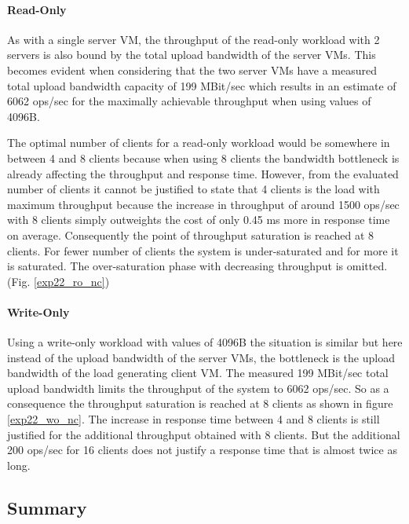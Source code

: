 \documentclass[report.tex]{subfiles}
\begin{document}
\paragraph{Read-Only}
As with a single server VM, the throughput of the read-only workload with 2 servers is also bound by the total upload bandwidth of the server VMs. This becomes evident when considering that the two server VMs have a measured total upload bandwidth capacity of 199 MBit/sec which results in an estimate of 6062 ops/sec for the maximally achievable throughput when using values of 4096B.

The optimal number of clients for a read-only workload would be somewhere in between 4 and 8 clients because when using 8 clients the bandwidth bottleneck is already affecting the throughput and response time. However, from the evaluated number of clients it cannot be justified to state that 4 clients is the load with maximum throughput because the increase in throughput of around 1500 ops/sec with 8 clients simply outweights the cost of only 0.45 ms more in response time on average. Consequently the point of throughput saturation is reached at 8 clients. For fewer number of clients the system is under-saturated and for more it is saturated. The over-saturation phase with decreasing throughput is omitted. (Fig. \ref{exp22_ro_nc})


\paragraph{Write-Only}
Using a write-only workload with values of 4096B the situation is similar but here instead of the upload bandwidth of the server VMs, the bottleneck is the upload bandwidth of the load generating client VM. The measured 199 MBit/sec total upload bandwidth limits the throughput of the system to 6062 ops/sec. So as a consequence  the throughput saturation is reached at 8 clients as shown in figure \ref{exp22_wo_nc}. The increase in response time between 4 and 8 clients is still justified for the additional throughput obtained with 8 clients. But the additional 200 ops/sec for 16 clients does not justify a response time that is almost twice as long.


\subsection{Summary}
\end{document}
